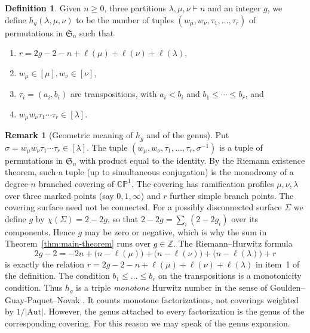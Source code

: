 \documentclass{article}
\theoremstyle{plain}
\theoremstyle{definition}
\newtheorem{dfn}[thm]{Definition}
\newtheorem{remark}[thm]{Remark}
\numberwithin{equation}{section}
\begin{document}
\begin{dfn}
    \label{def:h_g}
    Given $n \geq 0$, three partitions $\lambda, \mu, \nu \vdash n$ and an integer $g$, we define $h_g(\lambda, \mu, \nu)$ to be the number of tuples $\left(w_\mu, w_\nu, \tau_1, \ldots, \tau_r\right)$ of permutations in $\mathfrak{S}_n$ such that
    \begin{enumerate}
        \item $r=2 g-2-n+\ell(\mu)+\ell(\nu)+\ell(\lambda)$,
        \item $w_\mu \in [\mu], w_\nu \in [\nu]$,
        \item $\tau_i=\left(a_i, b_i\right)$ are transpositions, with $a_i<b_i$ and $b_1 \leq \cdots \leq b_r$, and
        \item $w_\mu w_\nu \tau_1 \cdots \tau_r \in [\lambda]$.
    \end{enumerate}
\end{dfn}

\begin{remark}[Geometric meaning of $h_g$ and of the genus]
\label{rem:hurwitz-geometry}
Put $\sigma = w_\mu w_\nu \tau_1\cdots\tau_r \in [\lambda]$. The tuple
$(w_\mu, w_\nu, \tau_1,\dots,\tau_r, \sigma^{-1})$ is a tuple of permutations in $\mathfrak S_n$
with product equal to the identity. By the Riemann existence theorem, such a tuple
(up to simultaneous conjugation) is the monodromy of a degree-$n$ branched covering of $\mathbb{CP}^1$.
The covering has ramification profiles $\mu,\nu,\lambda$ over three marked points
(say $0,1,\infty$) and $r$ further simple branch points. The covering surface
need not be connected. For a possibly disconnected surface $\Sigma$ we define $g$ by
$\chi(\Sigma)=2-2g$, so that $2-2g=\sum_i(2-2g_i)$ over its components.
Hence $g$ may be zero or negative, which is why the sum in Theorem~\ref{thm:main-theorem}
runs over $g\in\mathbb Z$. The Riemann--Hurwitz formula
\[
2g-2=-2n+\bigl(n-\ell(\mu)\bigr)+\bigl(n-\ell(\nu)\bigr)+\bigl(n-\ell(\lambda)\bigr)+r
\]
is exactly the relation $r=2g-2-n+\ell(\mu)+\ell(\nu)+\ell(\lambda)$ in item~1 of the definition.
The condition $b_1\le\dots\le b_r$ on the transpositions is a monotonicity condition.
Thus $h_g$ is a triple \emph{monotone} Hurwitz number in the sense of Goulden--Guay-Paquet--Novak \cite{goulden2012polynomialitymonotonehurwitznumbers, Goulden_2013}. It counts monotone factorizations, not coverings weighted by $1/|\mathrm{Aut}|$. However, the genus attached to every factorization is the genus of the
corresponding covering. For this reason we may speak of the genus expansion.
\end{remark}
\end{document}
